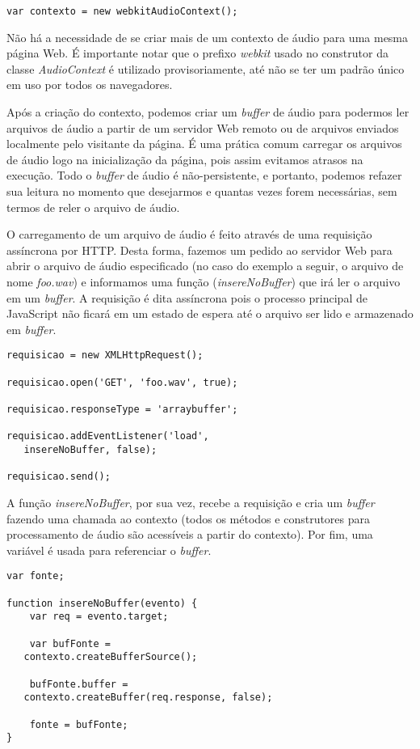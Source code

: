 \documentclass
  [ams,pdfout]%
        {aesbr}
\begin{document}
\begingroup
    \fontsize{8pt}{9pt}\selectfont
\begin{verbatim}
var contexto = new webkitAudioContext();
\end{verbatim}
\endgroup

Não há a necessidade de se criar mais de um contexto de áudio para uma
mesma página Web. É importante notar que o prefixo \emph{webkit} usado
no construtor da classe \emph{AudioContext} é utilizado
provisoriamente, até não se ter um padrão único em uso por todos os
navegadores.

Após a criação do contexto, podemos criar um \emph{buffer} de áudio
para podermos ler arquivos de áudio a partir de um servidor Web remoto
ou de arquivos enviados localmente pelo visitante da página. É uma
prática comum carregar os arquivos de áudio logo na inicialização da
página, pois assim evitamos atrasos na execução. Todo o \emph{buffer}
de áudio é não-persistente, e portanto, podemos refazer sua leitura no
momento que desejarmos e quantas vezes forem necessárias, sem termos
de reler o arquivo de áudio.

O carregamento de um arquivo de áudio é feito através de uma
requisição assíncrona por HTTP. Desta forma, fazemos um pedido ao
servidor Web para abrir o arquivo de áudio especificado (no caso do
exemplo a seguir, o arquivo de nome \emph{foo.wav}) e informamos uma
função (\emph{insereNoBuffer}) que irá ler o arquivo em um
\emph{buffer}. A requisição é dita assíncrona pois o processo
principal de JavaScript não ficará em um estado de espera até o
arquivo ser lido e armazenado em \emph{buffer}.

\begingroup
    \fontsize{8pt}{9pt}\selectfont
\begin{verbatim}
requisicao = new XMLHttpRequest();

requisicao.open('GET', 'foo.wav', true);

requisicao.responseType = 'arraybuffer';

requisicao.addEventListener('load', 
   insereNoBuffer, false);

requisicao.send();
\end{verbatim}
\endgroup

A função \emph{insereNoBuffer}, por sua vez, recebe a requisição e
cria um \emph{buffer} fazendo uma chamada ao contexto (todos os
métodos e construtores para processamento de áudio são acessíveis a
partir do contexto). Por fim, uma variável é usada para referenciar o
\emph{buffer}.

\begingroup
    \fontsize{8pt}{9pt}\selectfont
\begin{verbatim}
var fonte;

function insereNoBuffer(evento) {
    var req = evento.target;

    var bufFonte = 
   contexto.createBufferSource();

    bufFonte.buffer = 
   contexto.createBuffer(req.response, false);

    fonte = bufFonte;
}
\end{verbatim}
\endgroup
\end{document}
